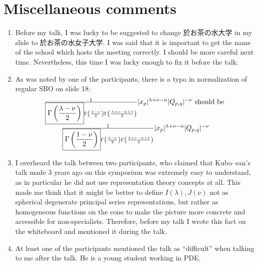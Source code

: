 \documentclass[12pt]{article} %
\theoremstyle{theorem}
\theoremstyle{definition}
\theoremstyle{remark}
\begin{document}
\section{Miscellaneous comments}
\begin{enumerate}
    \item Before my talk, I was lucky to be suggested to change 
於お茶の水大学 in my slide to 
於お茶の水女子大学. I was said that it is important to get the name of the school which hosts the meeting correctly.
I should be more careful next time. Nevertheless, this time I was lucky enough to fix it before the talk.
\item As was noted by one of the participants, there is a typo in normalization of regular SBO on slide 18:\begin{equation*}
        \begin{array}[]{c}
				\frac{1}{
                    \boxed{\Gamma
                        \left( \frac{\lambda - \nu}{2} \right)} \Gamma \left( \frac{\lambda - \nu}{2}
				\right) \Gamma \left( \frac{\lambda + \nu - n + 1}{2} \right)} | x_p
                |^{\lambda + \nu - n} | Q_{p, q} |^{- \nu}\mbox{ should be }\\
				\frac{1}{\boxed{\Gamma
                    \left( \frac{1 - \nu}{2} \right)} \Gamma \left( \frac{\lambda - \nu}{2}
				\right) \Gamma \left( \frac{\lambda + \nu - n + 1}{2} \right)} | x_p
                |^{\lambda + \nu - n} | Q_{p, q} |^{- \nu}
        \end{array}
    \end{equation*}
\item I overheard the talk between two participants, who claimed that Kubo--san's talk made 3 years ago on this symposium
    was extremely easy to understand, as in particular he did not use representation theory concepts at all.
    This made me think that it might be better to define $I(\lambda),J(\nu)$ not as spherical degenerate principal
    series representations, but rather as homogeneous functions on the cone to make the picture more concrete and accessible
    for non-specialists. Therefore, before my talk I wrote this fact on the whiteboard and mentioned it during the talk.
\item At least one of the participants mentioned the talk as ``difficult'' when talking to me after the talk. He is a young
    student working in PDE.
\end{enumerate}
\end{document}

